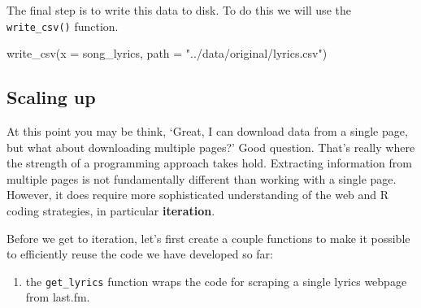 \documentclass[
  letterpaper,
]{latex/krantz}
\newenvironment{Shaded}{\begin{snugshade}}{\end{snugshade}}
\newcommand{\AttributeTok}[1]{\textcolor[rgb]{0.40,0.45,0.13}{#1}}
\newcommand{\FunctionTok}[1]{\textcolor[rgb]{0.28,0.35,0.67}{#1}}
\newcommand{\NormalTok}[1]{\textcolor[rgb]{0.00,0.23,0.31}{#1}}
\newcommand{\StringTok}[1]{\textcolor[rgb]{0.13,0.47,0.30}{#1}}
\providecommand{\tightlist}{%
  \setlength{\itemsep}{0pt}\setlength{\parskip}{0pt}}\usepackage{longtable,booktabs,array}
\begin{document}
The final step is to write this data to disk. To do this we will use the
\texttt{write\_csv()} function.

\begin{Shaded}
\begin{Highlighting}[]
\FunctionTok{write\_csv}\NormalTok{(}\AttributeTok{x =}\NormalTok{ song\_lyrics, }\AttributeTok{path =} \StringTok{"../data/original/lyrics.csv"}\NormalTok{)}
\end{Highlighting}
\end{Shaded}

\hypertarget{scaling-up}{%
\subsection{Scaling up}\label{scaling-up}}

At this point you may be think, `Great, I can download data from a
single page, but what about downloading multiple pages?' Good question.
That's really where the strength of a programming approach takes hold.
Extracting information from multiple pages is not fundamentally
different than working with a single page. However, it does require more
sophisticated understanding of the web and R coding strategies, in
particular \textbf{iteration}.

Before we get to iteration, let's first create a couple functions to
make it possible to efficiently reuse the code we have developed so far:

\begin{enumerate}
\def\labelenumi{\arabic{enumi}.}
\tightlist
\item
  the \texttt{get\_lyrics} function wraps the code for scraping a single
  lyrics webpage from last.fm.
\end{enumerate}
\end{document}
